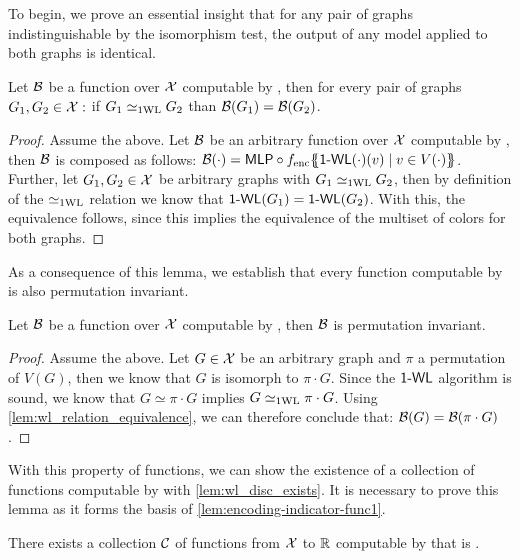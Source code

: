 To begin, we prove an essential insight that for any pair of graphs indistinguishable by the \wl isomorphism test, the output of any \wlnn model applied to both graphs is identical.
\begin{lemma}\label{lem:wl_relation_equivalence}
    Let $\mathcal{B}$ be a function over $\mathcal{X}$ computable by \wlnn, then for every pair of graphs $G_1, G_2 \in \mathcal{X}:$ if $G_1 \simeq_{\text{1WL}} G_2$ than $\mathcal{B}(G_1) = \mathcal{B}(G_2)$.
\end{lemma}
\begin{proof}
    Assume the above. Let $\mathcal{B}$ be an arbitrary function over $\mathcal{X}$ computable by \wlnn, then $\mathcal{B}$ is composed as follows: $\mathcal{B}(\cdot) = \textsf{MLP} \circ f_{\text{enc}} \{\!\!\{ \textsf{1-WL}(\cdot)(v) \mid v \in V(\cdot) \}\!\!\}$. Further, let $G_1, G_2 \in \mathcal{X}$ be arbitrary graphs with $G_1 \simeq_{\text{1WL}} G_2$, then by definition of the $\simeq_{\text{1WL}}$ relation we know that $\textsf{1-WL}(G_1) = \textsf{1-WL}(G_2)$. With this, the equivalence follows, since this implies the equivalence of the multiset of colors for both graphs.
\end{proof}

As a consequence of this lemma, we establish that every function computable by \wlnn is also permutation invariant.
\begin{corollary}\label{lem:wlnn_permutation_invariance}
    Let $\mathcal{B}$ be a function over $\mathcal{X}$ computable by \wlnn, then $\mathcal{B}$ is permutation invariant.
\end{corollary}

\begin{proof}
    Assume the above. Let $G \in \mathcal{X}$ be an arbitrary graph and $\pi$ a permutation of $V(G)$, then we know that $G$ is isomorph to $\pi \cdot G$. Since the $\textsf{1-WL}$ algorithm is sound, we know that $G \simeq \pi \cdot G$ implies $G \simeq_{\text{1WL}} \pi \cdot G$. Using \cref{lem:wl_relation_equivalence}, we can therefore conclude that: $\mathcal{B}(G) = \mathcal{B}(\pi \cdot G)$.
\end{proof}

With this property of \wlnn functions, we can show the existence of a \wldisc collection of functions computable by \wlnn with \cref{lem:wl_disc_exists}. It is necessary to prove this lemma as it forms the basis of \cref{lem:encoding-indicator-func1}.
\begin{lemma}\label{lem:wl_disc_exists}
    There exists a collection $\mathcal{C}$ of functions from $\mathcal{X}$ to $\mathbb{R}$ computable by \wlnn that is \wldisc.
\end{lemma}

